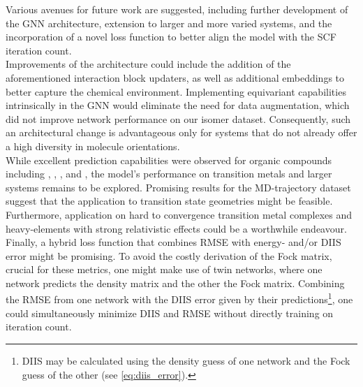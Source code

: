 Various avenues for future work are suggested, including further development of the GNN architecture, extension to larger and more varied systems, and the incorporation of a novel loss function to better align the model with the SCF iteration count. \\
Improvements of the architecture could include the addition of the aforementioned interaction block updaters, as well as additional embeddings to better capture the chemical environment. Implementing equivariant capabilities intrinsically in the GNN would eliminate the need for data augmentation, which did not improve network performance on our isomer dataset. Consequently, such an architectural change is advantageous only for systems that do not already offer a high diversity in molecule orientations.\\
While excellent prediction capabilities were observed for organic compounds including , , ,  and , the model's performance on transition metals and larger systems remains to be explored. Promising results for the MD-trajectory dataset suggest that the application to transition state geometries might be feasible.
Furthermore, application on hard to convergence transition metal complexes and heavy-elements with strong relativistic effects could be a worthwhile endeavour. \\
Finally, a hybrid loss function that combines RMSE with energy- and/or DIIS error might be promising. To avoid the costly derivation of the Fock matrix, crucial for these metrics, one might make use of twin networks, where one network predicts the density matrix and the other the Fock matrix. Combining the RMSE from one network with the DIIS error given by their predictions\footnote{DIIS may be calculated using the density guess of one network and the Fock guess of the other (see \autoref{eq:diis_error}).}, one could simultaneously minimize DIIS and RMSE without directly training on iteration count.
